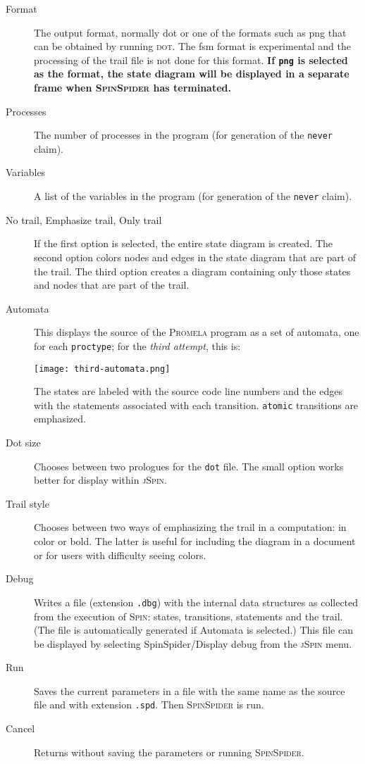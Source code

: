 \documentclass[11pt]{article}
\newcommand{\spn}{\textsc{Spin}}
\newcommand{\prm}{\textsc{Promela}}
\newcommand{\js}{\textsc{jSpin}}
\newcommand{\spd}{\textsc{SpinSpider}}
\newcommand{\dt}{\textsc{dot}}
\newcommand{\dtf}{\texttt{dot}}
\newcommand{\p}[1]{\texttt{#1}}
\newcommand{\bu}[1]{\textsf{#1}}
\begin{document}
\begin{description}
\item[\bu{Format}] The output format, normally \bu{dot} or one of the formats
such as \bu{png} that can be obtained by running \dt{}. The \bu{fsm} format is
experimental and the processing of the trail file is not done for this format.
\textbf{If \p{png} is selected as the format, the state diagram will be displayed in a
separate frame when \spd{} has terminated.}
\item[\bu{Processes}] The number of processes in the program (for generation of
the \p{never} claim).
\item[\bu{Variables}] A list of the variables in the program (for generation of
the \p{never} claim).
\item[\bu{No trail}, \bu{Emphasize trail}, \bu{Only trail}] If the first option
is selected, the entire state diagram is created. The second option colors nodes
and edges in the state diagram that are part of the trail. The third option
creates a diagram containing only those states and nodes that are part of the
trail.
\item[\bu{Automata}] This displays the source of the \prm{} program as a set
of automata, one for each \p{proctype}; for the \emph{third attempt}, this is:
\begin{center}
\texttt{[image: third-automata.png]}
\end{center}
The states are labeled with the source code line numbers and the edges with
the statements associated with each transition. \p{atomic} transitions
are emphasized.
\item[\bu{Dot size}] Chooses between two prologues for the \dtf{} file. The small
option works better for display within \js{}.
\item[\bu{Trail style}] Chooses between two ways of emphasizing the trail in a
computation: in color or bold. The latter is useful for including the diagram in
a document or for users with difficulty seeing colors.
\item[\bu{Debug}] Writes a file (extension \p{.dbg}) with the internal data
structures as collected from the execution of \spn{}: states, transitions,
statements and the trail. 
(The file is automatically generated if \bu{Automata} is selected.) 
This file can be displayed by selecting
\bu{SpinSpider/Display debug} from the \js{} menu.
\item[\bu{Run}] Saves the current parameters in a file with the same name as the
source file and with extension \p{.spd}. Then \spd{} is run.
\item[\bu{Cancel}] Returns without saving the parameters or running \spd{}.
\end{description}
\end{document}
